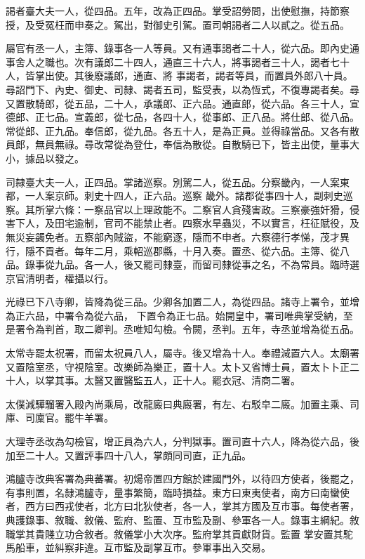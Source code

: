 \begin{pinyinscope}
 謁者臺大夫一人，從四品。五年，改為正四品。掌受詔勞問，出使慰撫，持節察授，及受冤枉而申奏之。駕出，對御史引駕。置司朝謁者二人以貳之。從五品。



 屬官有丞一人，主簿、錄事各一人等員。又有通事謁者二十人，從六品。即內史通事舍人之職也。次有議郎二十四人，通直三十六人，將事謁者三十人，謁者七十人，皆掌出使。其後廢議郎，通直、將
 事謁者，謁者等員，而置員外郎八十員。尋詔門下、內史、御史、司隸、謁者五司，監受表，以為恆式，不復專謁者矣。尋又置散騎郎，從五品，二十人，承議郎、正六品。通直郎，從六品。各三十人，宣德郎、正七品。宣義郎，從七品，各四十人，從事郎、正八品。將仕郎、從八品。常從郎、正九品。奉信郎，從九品。各五十人，是為正員。並得祿當品。又各有散員郎，無員無祿。尋改常從為登仕，奉信為散從。自散騎已下，皆主出使，量事大小，據品以發之。



 司隸臺大夫一人，正四品。掌諸巡察。別駕二人，從五品。分察畿內，一人案東都，一人案京師。刺史十四人，正六品。巡察
 畿外。諸郡從事四十人，副刺史巡察。其所掌六條：一察品官以上理政能不。二察官人貪殘害政。三察豪強奸猾，侵害下人，及田宅逾制，官司不能禁止者。四察水旱蟲災，不以實言，枉征賦役，及無災妄蠲免者。五察部內賊盜，不能窮逐，隱而不申者。六察德行孝悌，茂才異行，隱不貢者。每年二月，乘軺巡郡縣，十月入奏。置丞、從六品。主簿、從八品。錄事從九品。各一人，後又罷司隸臺，而留司隸從事之名，不為常員。臨時選京官清明者，權攝以行。



 光祿已下八寺卿，皆降為從三品。少卿各加置二人，為從四品。諸寺上署令，並增為正六品，中署令為從六品，
 下置令為正七品。始開皇中，署司唯典掌受納，至是署令為判首，取二卿判。丞唯知勾檢。令闕，丞判。五年，寺丞並增為從五品。



 太常寺罷太祝署，而留太祝員八人，屬寺。後又增為十人。奉禮減置六人。太廟署又置陰室丞，守視陰室。改樂師為樂正，置十人。太卜又省博士員，置太卜卜正二十人，以掌其事。太醫又置醫監五人，正十人。罷衣冠、清商二署。



 太僕減驊騮署入殿內尚乘局，改龍廄曰典廄署，有左、右駁皁二廄。加置主乘、司庫、司廩官。罷牛羊署。



 大理寺丞改為勾檢官，增正員為六人，分判獄事。置司直十六人，降為從六品，後加至二十人。又置評事四十八人，掌頗同司直，正九品。



 鴻臚寺改典客署為典蕃署。初煬帝置四方館於建國門外，以待四方使者，後罷之，有事則置，名隸鴻臚寺，量事繁簡，臨時損益。東方曰東夷使者，南方曰南蠻使者，西方曰西戎使者，北方曰北狄使者，各一人，掌其方國及互市事。每使者署，典護錄事、敘職、敘儀、監府、監置、互市監及副、參軍各一人。錄事主綱紀。敘職掌其貴賤立功合敘者。敘儀掌小大次序。監府掌其貢獻財貨。監置
 掌安置其駝馬船車，並糾察非違。互市監及副掌互市。參軍事出入交易。




\end{pinyinscope}
